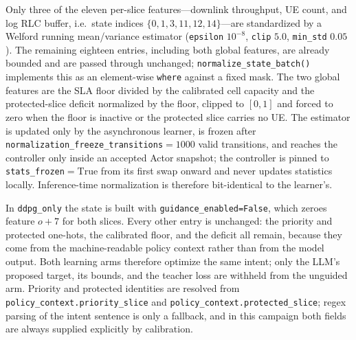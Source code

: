 Only three of the eleven per-slice features---downlink throughput, UE count, and log RLC buffer, i.e.\ state indices $\{0,1,3,11,12,14\}$---are standardized by a Welford running mean/variance estimator (\texttt{epsilon} $10^{-8}$, \texttt{clip} $5.0$, \texttt{min\_std} $0.05$). The remaining eighteen entries, including both global features, are already bounded and are passed through unchanged; \texttt{normalize\_state\_batch()} implements this as an element-wise \texttt{where} against a fixed mask. The two global features are the SLA floor divided by the calibrated cell capacity and the protected-slice deficit normalized by the floor, clipped to $[0,1]$ and forced to zero when the floor is inactive or the protected slice carries no UE. The estimator is updated only by the asynchronous learner, is frozen after \texttt{normalization\_freeze\_transitions}${}=1000$ valid transitions, and reaches the controller only inside an accepted Actor snapshot; the controller is pinned to \texttt{stats\_frozen}${}=\mathrm{True}$ from its first swap onward and never updates statistics locally. Inference-time normalization is therefore bit-identical to the learner's.

In \texttt{ddpg\_only} the state is built with \texttt{guidance\_enabled=False}, which zeroes feature $o{+}7$ for both slices. Every other entry is unchanged: the priority and protected one-hots, the calibrated floor, and the deficit all remain, because they come from the machine-readable policy context rather than from the model output. Both learning arms therefore optimize the same intent; only the LLM's proposed target, its bounds, and the teacher loss are withheld from the unguided arm. Priority and protected identities are resolved from \texttt{policy\_context.priority\_slice} and \texttt{policy\_context.protected\_slice}; regex parsing of the intent sentence is only a fallback, and in this campaign both fields are always supplied explicitly by calibration.

